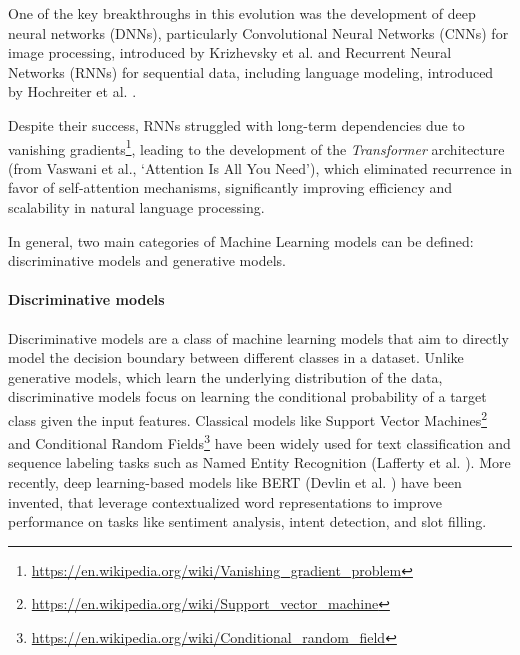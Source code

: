 One of the key breakthroughs in this evolution was the development of deep neural
networks (DNNs), particularly Convolutional Neural Networks (CNNs) for image
processing, introduced by Krizhevsky et al. \cite{articleCNN} and Recurrent
Neural Networks (RNNs) for sequential data, including language modeling,
introduced by Hochreiter et al. \cite{articleRNN}.

Despite their success, RNNs struggled with long-term dependencies due to
vanishing gradients\footnote{\url{https://en.wikipedia.org/wiki/Vanishing_gradient_problem}},
leading to the development of the \emph{Transformer} architecture (from Vaswani
et al., `Attention Is All You Need'\cite{vaswani2023attentionneed}), which eliminated
recurrence in favor of self-attention mechanisms, significantly improving
efficiency and scalability in natural language processing.

In general, two main categories of Machine Learning models can be defined:
discriminative models and generative models.

\paragraph{Discriminative models}
Discriminative models are a class of machine learning models that aim to directly
model the decision boundary between different classes in a dataset. Unlike
generative models, which learn the underlying distribution of the data,
discriminative models focus on learning the conditional probability of a target
class given the input features. Classical models like Support Vector Machines\footnote{\url{https://en.wikipedia.org/wiki/Support_vector_machine}}
and Conditional Random Fields\footnote{\url{https://en.wikipedia.org/wiki/Conditional_random_field}}
have been widely used for text classification and sequence labeling tasks such as
Named Entity Recognition (Lafferty et al. \cite{crf}). More recently, deep
learning-based models like BERT (Devlin et al.
\cite{devlin2019bertpretrainingdeepbidirectional}) have been invented, that
leverage contextualized word representations to improve performance on tasks
like sentiment analysis, intent detection, and slot filling.

